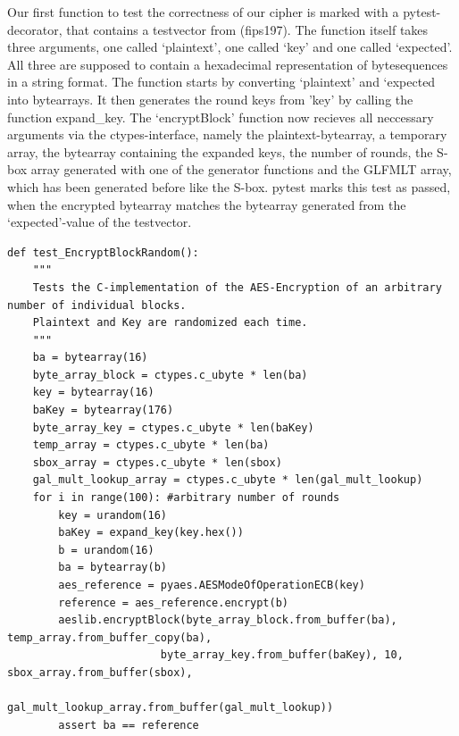 Our first function to test the correctness of our cipher is marked with
a pytest-decorator, that contains a testvector from (fips197). The
function itself takes three arguments, one called `plaintext', one
called `key' and one called `expected'. All three are supposed to
contain a hexadecimal representation of bytesequences in a string
format. The function starts by converting `plaintext' and `expected into
bytearrays. It then generates the round keys from 'key' by calling the
function expand\_key. The `encryptBlock' function now recieves all
neccessary arguments via the ctypes-interface, namely the
plaintext-bytearray, a temporary array, the bytearray containing the
expanded keys, the number of rounds, the S-box array generated with one
of the generator functions and the GLFMLT array, which has been
generated before like the S-box. pytest marks this test as passed, when
the encrypted bytearray matches the bytearray generated from the
`expected'-value of the testvector.

\begin{lstlisting}
def test_EncryptBlockRandom():
    """
    Tests the C-implementation of the AES-Encryption of an arbitrary number of individual blocks.
    Plaintext and Key are randomized each time.
    """
    ba = bytearray(16)
    byte_array_block = ctypes.c_ubyte * len(ba)
    key = bytearray(16)
    baKey = bytearray(176)
    byte_array_key = ctypes.c_ubyte * len(baKey)
    temp_array = ctypes.c_ubyte * len(ba)
    sbox_array = ctypes.c_ubyte * len(sbox)
    gal_mult_lookup_array = ctypes.c_ubyte * len(gal_mult_lookup)
    for i in range(100): #arbitrary number of rounds
        key = urandom(16)
        baKey = expand_key(key.hex())
        b = urandom(16)
        ba = bytearray(b)
        aes_reference = pyaes.AESModeOfOperationECB(key)
        reference = aes_reference.encrypt(b)
        aeslib.encryptBlock(byte_array_block.from_buffer(ba), temp_array.from_buffer_copy(ba),
                        byte_array_key.from_buffer(baKey), 10, sbox_array.from_buffer(sbox),
                        gal_mult_lookup_array.from_buffer(gal_mult_lookup))
        assert ba == reference
\end{lstlisting}


